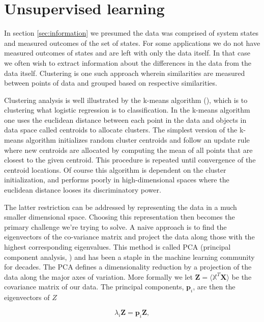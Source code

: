 \section{Unsupervised learning}\label{sec:unsupervised_learning}

In section \ref{sec:information} we presumed the data was comprised of system states and measured outcomes of the set of states. For some applications we do not have measured outcomes of states and are left with only the data itself. In that case we often wish to extract information about the differences in the data from the data itself. Clustering is one such approach wherein similarities are measured between points of data and grouped based on respective similarities.

Clustering analysis is well illustrated by the k-means algorithm (\cite{Neyman1967}), which is to clustering what logistic regression is to classification.  In the k-means algorithm one uses the euclidean distance between each point in the data and objects in data space called centroids to allocate clusters. The simplest version of the k-means algorithm initializes random cluster centroids and follow an update rule where new centroids are allocated by computing the mean of all points that are closest to the given centroid. This procedure is repeated until convergence of the centroid locations. Of course this algorithm is dependent on the cluster initialization, and performs poorly in high-dimensional spaces where the euclidean distance looses its discriminatory power. 

The latter restriction can be addressed by representing the data in a much smaller dimensional space. Choosing this representation then becomes the primary challenge we're trying to solve. A naive approach is to find the eigenvectors of the co-variance matrix and project the data along those with the highest corresponding eigenvalues. This method is called PCA (principal component analysis, \cite{Marsland2009}) and has been a staple in the machine learning community for decades. The PCA defines a dimensionality reduction by a projection of the data along the major axes of variation. More formally we let $\mathbf{Z} = \langle \mathbb{X}^T\mathbf{X}\rangle$ be the covariance matrix of our data. The principal components, $\mathbf{p}_i$, are then the eigenvectors of $Z$ 

\begin{equation}\label{eq:pca}
\lambda_i \mathbf{Z} = \mathbf{p}_i \mathbf{Z},
\end{equation}

